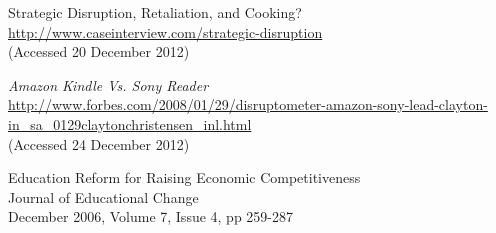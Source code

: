 \documentclass[a4paper,10pt]{book}
\begin{document}
\begin{thebibliography}{9}
Strategic Disruption, Retaliation, and Cooking? \\
\url{http://www.caseinterview.com/strategic-disruption}\\
(Accessed 20 December 2012)

  \emph{Amazon Kindle Vs. Sony Reader} \\
  \url{http://www.forbes.com/2008/01/29/disruptometer-amazon-sony-lead-clayton-in_sa_0129claytonchristensen_inl.html}\\
 (Accessed 24 December 2012)


Education Reform for Raising Economic Competitiveness\\
Journal of Educational Change\\
December 2006, Volume 7, Issue 4, pp 259-287\\

\end{thebibliography}
\end{document}
